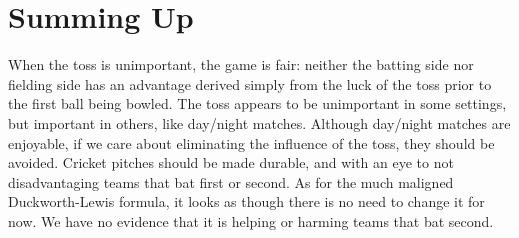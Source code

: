\documentclass[11pt,  letterpaper]{article}
\begin{document}
%
%
%
%
%
%
%
%

\section{Summing Up}

When the toss is unimportant, the game is fair: neither the batting side nor fielding side has an advantage derived simply from the luck of the toss prior to the first ball being bowled.  The toss appears to be unimportant in some settings, but important in others, like day/night matches. Although day/night matches are enjoyable, if we care about eliminating the influence of the toss, they should be avoided. Cricket pitches should be made durable, and with an eye to not disadvantaging teams that bat first or second. As for the much maligned Duckworth-Lewis formula, it looks as though there is no need to change it for now. We have no evidence that it is helping or harming teams that bat second. 




\clearpage
\end{document}
